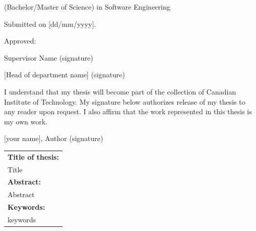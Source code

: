 \documentclass[fontsize=12pt, oneside, chapterprefix=false]{scrreprt}
\begin{document}
\noindent \fontsize{11}{13.5}\selectfont (Bachelor/Master of Science) in Software Engineering

\noindent Submitted on [dd/mm/yyyy].

\bigskip

\noindent  Approved:

\noindent \underline{\hspace{3.2in}} Supervisor Name \hspace*{\fill} (signature)

\bigskip
\bigskip
\bigskip
\bigskip

\noindent  \underline{\hspace{3.2in}} [Head of department name] \hspace*{\fill} (signature)

\vspace*{\fill}

\noindent I understand that my thesis will become part of the collection of Canadian Institute of Technology. My signature below authorizes release of my thesis to any reader upon request. I also affirm that the work represented in this thesis is my own work.
\bigskip
\bigskip

\noindent  \underline{\hspace{3.2in}} [your name], Author \hspace*{\fill} (signature)
\thispagestyle{plain}
\setcounter{page}{2}
\newpage

\thispagestyle{plain}
\noindent \begin{tabular}{|p{6.0in}|}\hline
	\textbf{\fontsize{11}{13.5}\selectfont Title of thesis:}                            \\
	Title \\
	\hline
	\textbf{\fontsize{11}{13.5}\selectfont Abstract:}                                   \\
	\fontsize{11}{13.5}\selectfont

	Abstract

	\vspace*{\fill}                                                                     \\\hline
	\textbf{\fontsize{11}{13.5}\selectfont Keywords:}                                   \\
	\fontsize{11}{13.5}\selectfont keywords                                             \\\hline
\end{tabular}

\newpage
\end{document}

